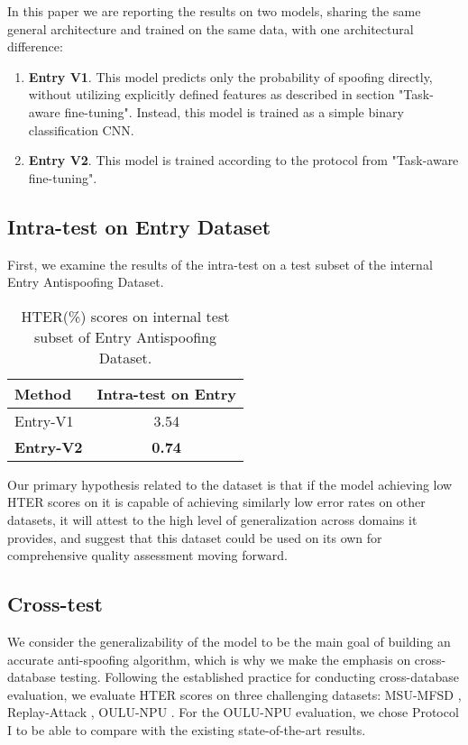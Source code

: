 \documentclass[10pt,twocolumn,letterpaper]{article}
\begin{document}
In this paper we are reporting the results on two models, sharing the same general architecture and trained on the same data, with one architectural difference:

\begin{enumerate}
    \item \textbf{Entry V1}. This model predicts only the probability of spoofing directly, without utilizing explicitly defined features as described in section "Task-aware fine-tuning". Instead, this model is trained as a simple binary classification CNN.
    \item \textbf{Entry V2}. This model is trained according to the protocol from "Task-aware fine-tuning".
\end{enumerate}

\subsection{Intra-test on Entry Dataset}

First, we examine the results of the intra-test on a test subset of the internal Entry Antispoofing Dataset.

\begin{table}[h]
  \centering
  \begin{tabular}{@{}lc@{}}
    \toprule
    \textbf{Method} & \textbf{Intra-test on Entry} \\
    \midrule
    \midrule
    Entry-V1 & 3.54 \\
    \textbf{Entry-V2} & \textbf{0.74} \\
    \bottomrule
  \end{tabular}
  \caption{HTER(\%) scores on internal test subset of Entry Antispoofing Dataset. }
  \label{tab:intra-test}
\end{table}

Our primary hypothesis related to the dataset is that if the model achieving low HTER scores on it is capable of achieving similarly low error rates on other datasets, it will attest to the high level of generalization across domains it provides, and suggest that this dataset could be used on its own for comprehensive quality assessment moving forward.

\subsection{Cross-test}

We consider the generalizability of the model to be the main goal of building an accurate anti-spoofing algorithm, which is why we make the emphasis on cross-database testing. Following the established practice for conducting cross-database evaluation, we evaluate HTER scores on three challenging datasets: MSU-MFSD \cite{MFSD}, Replay-Attack \cite{mci/Chingovska2012}, OULU-NPU \cite{OULU_NPU_2017}. For the OULU-NPU evaluation, we chose Protocol I to be able to compare with the existing state-of-the-art results.
\end{document}
